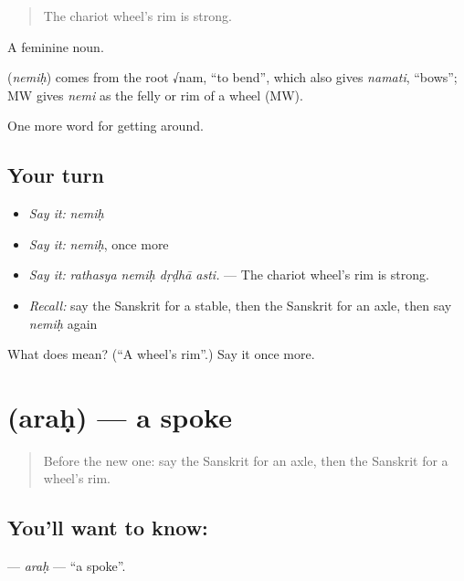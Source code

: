 \begin{quote}
The chariot wheel's rim is strong.
\end{quote}

A feminine noun.

\begin{cousinweb}
\textbf{} (\emph{nemiḥ}) comes from the root √nam, \textquotedblleft{}to bend\textquotedblright{}, which also gives \emph{namati}, \textquotedblleft{}bows\textquotedblright{}; MW gives \emph{nemi} as the felly or rim of a wheel (MW).
\end{cousinweb}

\begin{grammarlens}[title={What you've built}]
One more word for getting around.
\end{grammarlens}

\subsection*{Your turn}
\begin{itemize}
\raggedright
  \item \emph{Say it:} \emph{nemiḥ}
  \item \emph{Say it:} \emph{nemiḥ}, once more
  \item \emph{Say it:} \emph{rathasya nemiḥ dṛḍhā asti.} — The chariot wheel's rim is strong.
  \item \emph{Recall:} say the Sanskrit for a stable, then the Sanskrit for an axle, then say \emph{nemiḥ} again
\end{itemize}

\begin{tcolorbox}[breakable,colback=teal!4,colframe=teal!35!black,title={Before you move on}]
What does  mean? (\textquotedblleft{}A wheel's rim\textquotedblright{}.) Say it once more.
\end{tcolorbox}
\section[\texorpdfstring{\sk{अरः} (araḥ)}{अरः (araḥ)}]{ (araḥ) — a spoke}

\label{lesson:SA-C409-arah}



\begin{quote}
Before the new one: say the Sanskrit for an axle, then the Sanskrit for a wheel's rim.
\end{quote}

\subsection*{You'll want to know: }
\textbf{} — \emph{araḥ} — \textquotedblleft{}a spoke\textquotedblright{}.

